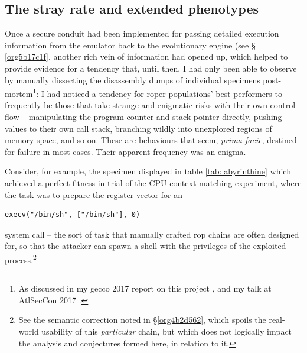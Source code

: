 \documentclass[12pt,glossary]{dalthesis}
\begin{document}
\subsection{The stray rate and extended phenotypes}
\label{sec:orga6d6582}
\label{org1ef9885}

Once a secure conduit had been implemented for passing detailed execution
information from the emulator back to the evolutionary engine (see \S
\ref{org5b17c1f},
another rich vein of information had opened up, which helped to provide evidence for a
tendency that, until then, I had only been able to observe by manually
dissecting the disassembly dumps of individual specimens post-mortem\footnote{As discussed in my \gls{gecco} 2017 report on this project \cite{fraser17_gecco},
  and my talk at AtlSecCon 2017 \cite{fraser17_atlseccon}.}: I had noticed a tendency for \gls{roper} populations' best
performers to frequently be those that take strange and enigmatic risks with their own
control flow -- manipulating the program counter and stack pointer directly,
pushing values to their own call stack, branching wildly into unexplored regions
of memory space, and so on. These are behaviours that seem, \emph{prima facie}, destined
for failure in most cases. Their apparent frequency was an enigma. 

Consider, for example, the specimen displayed in 
table \ref{tab:labyrinthine} which
achieved a perfect fitness in trial of the CPU context matching experiment,
where the task was to prepare the register vector for an
\begin{verbatim}
execv("/bin/sh", ["/bin/sh"], 0)
\end{verbatim}
system call -- the sort of task that manually crafted \gls{rop} chains are often
designed for, so that the attacker can spawn a shell with the privileges of the
exploited process.\footnote{See the semantic correction noted in \S \ref{org4b2d562}, which 
  spoils the real-world usability of this \emph{particular} chain, but which
  does not logically impact the analysis and conjectures formed here,
  in relation to it.}
\end{document}
